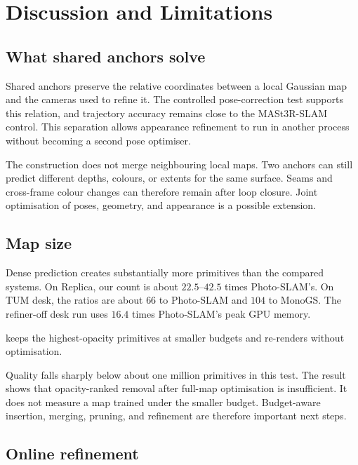 \chapter{Discussion and Limitations}
\label{ch:discussion}

\section{What shared anchors solve}

Shared anchors preserve the relative coordinates between a local Gaussian
map and the cameras used to refine it. The controlled pose-correction test
supports this relation, and trajectory accuracy remains close to the
MASt3R-SLAM control. This separation allows appearance refinement to run in
another process without becoming a second pose optimiser.

The construction does not merge neighbouring local maps. Two anchors can
still predict different depths, colours, or extents for the same surface.
Seams and cross-frame colour changes can therefore remain after loop closure.
Joint optimisation of poses, geometry, and appearance is a possible extension.

\section{Map size}
\label{sec:lim:compact}

Dense prediction creates substantially more primitives than the compared
systems. On Replica, our count is about $22.5$--$42.5$ times Photo-SLAM's.
On TUM desk, the ratios are about $66$ to Photo-SLAM and $104$ to MonoGS.
The refiner-off desk run uses $16.4$ times Photo-SLAM's peak GPU memory.

 keeps the highest-opacity primitives at smaller budgets and
re-renders without optimisation.



Quality falls sharply below about one million primitives in this test.
The result shows that opacity-ranked removal after full-map optimisation is
insufficient. It does not measure a map trained under the smaller budget.
Budget-aware insertion, merging, pruning, and refinement are therefore
important next steps.

\section{Online refinement}

